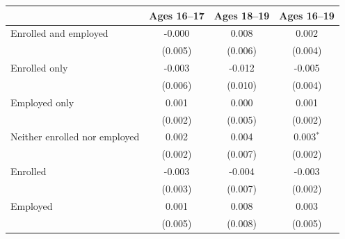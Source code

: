\begin{tabular}{lccc}
\toprule
 & Ages 16--17 & Ages 18--19 & Ages 16--19 \\
\midrule
Enrolled and employed & -0.000 & 0.008 & 0.002 \\
 & (0.005) & (0.006) & (0.004) \\
Enrolled only & -0.003 & -0.012 & -0.005 \\
 & (0.006) & (0.010) & (0.004) \\
Employed only & 0.001 & 0.000 & 0.001 \\
 & (0.002) & (0.005) & (0.002) \\
Neither enrolled nor employed & 0.002 & 0.004 & 0.003$^{*}$ \\
 & (0.002) & (0.007) & (0.002) \\
Enrolled & -0.003 & -0.004 & -0.003 \\
 & (0.003) & (0.007) & (0.002) \\
Employed & 0.001 & 0.008 & 0.003 \\
 & (0.005) & (0.008) & (0.005) \\
\bottomrule
\end{tabular}
